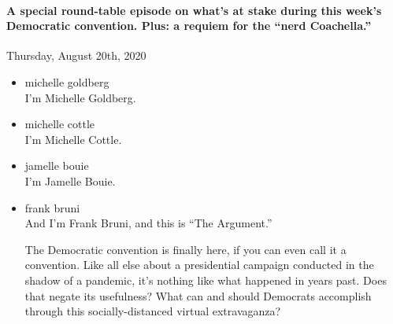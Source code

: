 \hypertarget{a-special-round-table-episode-on-whats-at-stake-during-this-weeks-democratic-convention-plus-a-requiem-for-the-nerd-coachella-2}{%
\paragraph{A special round-table episode on what's at stake during this
week's Democratic convention. Plus: a requiem for the ``nerd
Coachella.''}\label{a-special-round-table-episode-on-whats-at-stake-during-this-weeks-democratic-convention-plus-a-requiem-for-the-nerd-coachella-2}}

Thursday, August 20th, 2020

\begin{itemize}
\item
  michelle goldberg\\
  I'm Michelle Goldberg.
\item
  michelle cottle\\
  I'm Michelle Cottle.
\item
  jamelle bouie\\
  I'm Jamelle Bouie.
\item
  frank bruni\\
  And I'm Frank Bruni, and this is ``The Argument.''

  The Democratic convention is finally here, if you can even call it a
  convention. Like all else about a presidential campaign conducted in
  the shadow of a pandemic, it's nothing like what happened in years
  past. Does that negate its usefulness? What can and should Democrats
  accomplish through this socially-distanced virtual extravaganza?


\end{itemize}
